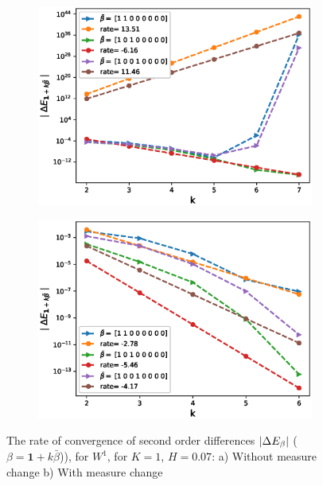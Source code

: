 \documentclass[11pt]{article}
\begin{document}
 
 \begin{figure}[h!]
 	\centering
 	\begin{subfigure}{.4\textwidth}
 		\centering
 		\includegraphics[width=1\linewidth]{./figures/rBergomi_mixed_error_rates/without_change_measure/N_4/H_007/mixed_difference_order2_rbergomi_4steps_H_007_K_1_totally_hierarch_with_rate_W1}
 		\caption{}
 		\label{fig:sub3}
 	\end{subfigure}%
 	\begin{subfigure}{.4\textwidth}
 		\centering
 		\includegraphics[width=1\linewidth]{./figures/rBergomi_mixed_error_rates/partial_change_measure/N_4/H_007/mixed_difference_order2_rbergomi_4steps_H_007_K_1_totally_hierarch_with_rate_W1_change_measure_part_spec}
 		\caption{}
 		\label{fig:sub4}
 	\end{subfigure}
 	
 	\caption{The rate of convergence of  second order differences $\left\lvert\Delta E_{\beta}\right\rvert$ ($\beta=\mathbf{1}+k \bar{\beta}$)), for $W^1$, for $K=1$, $H=0.07$: a) Without measure change b) With measure change}
 	\label{fig:second_diff_comp_K_1_H_007_W_1}
 \end{figure}
 
\end{document}
